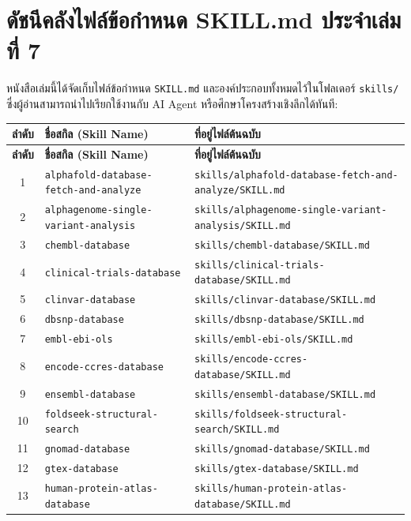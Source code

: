 \section{ดัชนีคลังไฟล์ข้อกำหนด SKILL.md ประจำเล่มที่ 7}

หนังสือเล่มนี้ได้จัดเก็บไฟล์ข้อกำหนด \texttt{SKILL.md} และองค์ประกอบทั้งหมดไว้ในโฟลเดอร์ \texttt{skills/} ซึ่งผู้อ่านสามารถนำไปเรียกใช้งานกับ AI Agent หรือศึกษาโครงสร้างเชิงลึกได้ทันที:

\small
\begin{longtable}{|c|p{}|p{}|}
\hline
\textbf{ลำดับ} & \textbf{ชื่อสกิล (Skill Name)} & \textbf{ที่อยู่ไฟล์ต้นฉบับ} \\ \hline
\endfirsthead
\hline
\textbf{ลำดับ} & \textbf{ชื่อสกิล (Skill Name)} & \textbf{ที่อยู่ไฟล์ต้นฉบับ} \\ \hline
\endhead
1 & \texttt{alphafold-database-fetch-and-analyze} & \texttt{skills/alphafold-database-fetch-and-analyze/SKILL.md} \\ \hline
2 & \texttt{alphagenome-single-variant-analysis} & \texttt{skills/alphagenome-single-variant-analysis/SKILL.md} \\ \hline
3 & \texttt{chembl-database} & \texttt{skills/chembl-database/SKILL.md} \\ \hline
4 & \texttt{clinical-trials-database} & \texttt{skills/clinical-trials-database/SKILL.md} \\ \hline
5 & \texttt{clinvar-database} & \texttt{skills/clinvar-database/SKILL.md} \\ \hline
6 & \texttt{dbsnp-database} & \texttt{skills/dbsnp-database/SKILL.md} \\ \hline
7 & \texttt{embl-ebi-ols} & \texttt{skills/embl-ebi-ols/SKILL.md} \\ \hline
8 & \texttt{encode-ccres-database} & \texttt{skills/encode-ccres-database/SKILL.md} \\ \hline
9 & \texttt{ensembl-database} & \texttt{skills/ensembl-database/SKILL.md} \\ \hline
10 & \texttt{foldseek-structural-search} & \texttt{skills/foldseek-structural-search/SKILL.md} \\ \hline
11 & \texttt{gnomad-database} & \texttt{skills/gnomad-database/SKILL.md} \\ \hline
12 & \texttt{gtex-database} & \texttt{skills/gtex-database/SKILL.md} \\ \hline
13 & \texttt{human-protein-atlas-database} & \texttt{skills/human-protein-atlas-database/SKILL.md} \\ \hline

\end{longtable}
